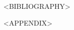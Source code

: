 \documentclass[conference]{IEEEtran}
\begin{document}





% 
<BIBLIOGRAPHY>


<APPENDIX>
\end{document}
